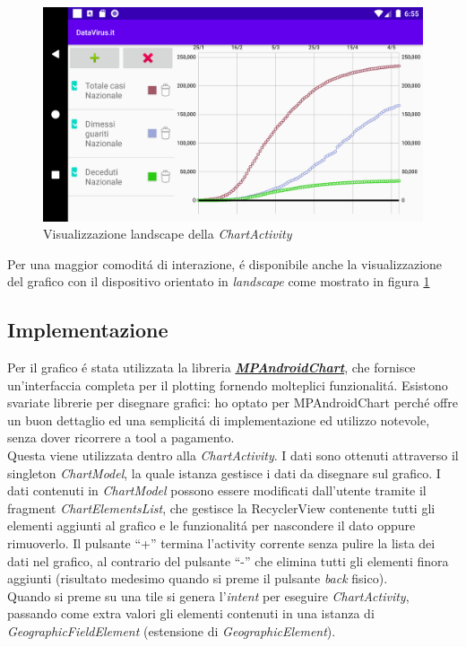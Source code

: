 \documentclass{article}
\newcommand{\quotes}[1]{``#1''}
\begin{document}
    \begin{figure}[h]
      \centering
      \includegraphics[width=.8\linewidth]{land_chart.png}
      \caption{Visualizzazione landscape della \emph{ChartActivity}}
      \label{fig5a}
    \end{figure}

    Per una maggior comoditá di interazione, é disponibile anche la visualizzazione del grafico con il dispositivo orientato in \emph{landscape} come mostrato in figura \ref{fig5a}

    \subsection{Implementazione}

    Per il grafico é stata utilizzata la libreria \href{https://github.com/PhilJay/MPAndroidChart}{\emph{\textbf{MPAndroidChart}}}, 
    che fornisce un'interfaccia completa per il plotting fornendo molteplici funzionalitá.
    Esistono svariate librerie per disegnare grafici: ho optato per MPAndroidChart perché offre un buon dettaglio ed una semplicitá di implementazione ed utilizzo notevole, senza dover ricorrere a tool a pagamento.
    \\
    Questa viene utilizzata dentro alla \emph{ChartActivity}. I dati sono ottenuti attraverso il singleton \emph{ChartModel}, la quale istanza gestisce i dati da disegnare sul grafico.
    I dati contenuti in \emph{ChartModel} possono essere modificati dall'utente tramite il fragment \emph{ChartElementsList}, che gestisce la RecyclerView contenente tutti gli elementi aggiunti al grafico e le funzionalitá per nascondere il dato oppure rimuoverlo.
    Il pulsante \quotes{+} termina l'activity corrente senza pulire la lista dei dati nel grafico, al contrario del pulsante \quotes{-} che elimina tutti gli elementi finora aggiunti (risultato medesimo quando si preme il pulsante \emph{back} fisico).
    \\
    Quando si preme su una tile si genera l'\emph{intent} per eseguire \emph{ChartActivity}, passando come extra valori gli elementi contenuti in una istanza di \emph{GeographicFieldElement} (estensione di \emph{GeographicElement}).
\end{document}
